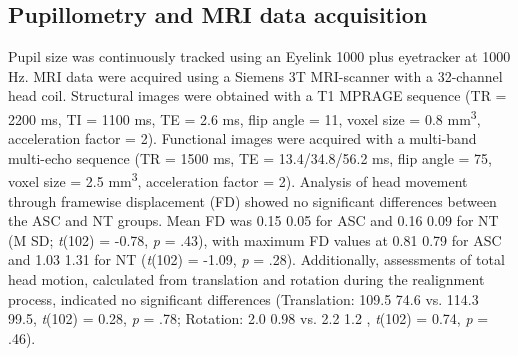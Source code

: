 \subsection*{Pupillometry and MRI data acquisition}
Pupil size was continuously tracked using an Eyelink 1000 plus eyetracker at 1000 Hz. MRI data were acquired using a Siemens 3T MRI-scanner with a 32-channel head coil. Structural images were obtained with a T1 MPRAGE sequence (TR = 2200 ms, TI = 1100 ms, TE = 2.6 ms, flip angle = 11\textdegree, 
voxel size = 0.8 mm\textsuperscript{3}, acceleration factor = 2). Functional images were acquired with a multi-band multi-echo sequence (TR = 1500 ms, TE = 13.4/34.8/56.2 ms, flip angle = 75\textdegree, voxel size = 2.5 mm\textsuperscript{3}, acceleration factor = 2). Analysis of head movement through framewise displacement (FD) showed no significant differences between the ASC and NT groups. Mean FD was 0.15 \textpm{}{} 0.05 for ASC and 0.16 \textpm{}{} 0.09 for NT (M \textpm{} SD; \textit{t}(102) = -0.78, \textit{p} = .43), with maximum FD values at 0.81 \textpm{} 0.79 for ASC and 1.03 \textpm{} 1.31 for NT (\textit{t}(102) = -1.09, \textit{p} = .28). Additionally, assessments of total head motion, calculated from translation and rotation during the realignment process, indicated no significant differences (Translation: 109.5 \textpm{} 74.6 vs. 114.3 \textpm{} 99.5, \textit{t}(102) = 0.28, \textit{p} = .78; Rotation: 2.0 \textpm{} 0.98 vs. 2.2 \textpm{} 1.2 , \textit{t}(102) = 0.74, \textit{p} = .46).

